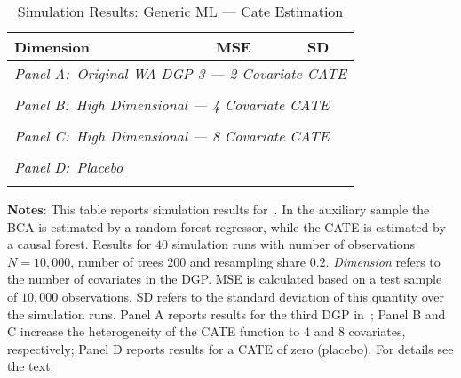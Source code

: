 \documentclass[11pt, a4paper, leqno]{article}
\begin{document}
\begin{table}
    \caption{Simulation Results: Generic ML --- Cate Estimation}\label{table:generic_ml_cate}
    \begin{threeparttable}
    \center
    \begin{tabular}{lcc}
        Dimension & MSE & SD \\
        \toprule
        \multicolumn{3}{l}{\textit{Panel A:\ Original WA DGP 3 --- 2 Covariate CATE}} \\
         \\
        \midrule

        \multicolumn{3}{l}{\textit{Panel B:\ High Dimensional --- 4 Covariate CATE}} \\
         \\
        \midrule

        \multicolumn{3}{l}{\textit{Panel C:\ High Dimensional --- 8 Covariate CATE}} \\
         \\
        \midrule

        \multicolumn{3}{l}{\textit{Panel D:\ Placebo}} \\
         \\
        \bottomrule
    \end{tabular}
    \begin{tablenotes}
        \small
        \item \textbf{Notes}: This table reports simulation results for~\cite{chernozhukov2023genml}.
        In the auxiliary sample the BCA is estimated by a random forest regressor, while the CATE is estimated by a causal forest.
        Results for $40$ simulation runs with number of observations $N=10,000$, number of trees $200$ and resampling share $0.2$.
        \textit{Dimension} refers to the number of covariates in the DGP\@.
        MSE is calculated based on a test sample of $10,000$ observations. SD refers to the standard deviation of this quantity over the simulation runs.
        Panel A reports results for the third DGP in~\cite{wager2018estimation}; Panel B and C increase the heterogeneity of the CATE function to 4 and 8 covariates, respectively; Panel D reports results for a CATE of zero (placebo).
        For details see the text.
    \end{tablenotes}
\end{threeparttable}

\end{table}
\end{document}
